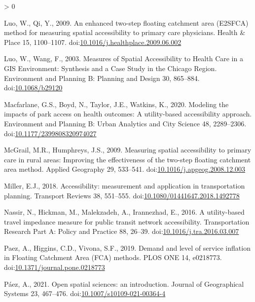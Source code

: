 \documentclass[]{elsarticle} %
\newlength{\cslhangindent}
\newenvironment{CSLReferences}[2] %
 {%
  \setlength{\parindent}{0pt}
  \ifodd #1 \everypar{\setlength{\hangindent}{\cslhangindent}}\ignorespaces\fi
  \ifnum #2 > 0
  \setlength{\parskip}{#2\baselineskip}
  \fi
 }%
 {}
\begin{document}
\begin{CSLReferences}{1}{0}
\leavevmode\hypertarget{ref-luo2009}{}%
Luo, W., Qi, Y., 2009. An enhanced two-step floating catchment area
(E2SFCA) method for measuring spatial accessibility to primary care
physicians. Health \& Place 15, 1100--1107.
doi:\href{https://doi.org/10.1016/j.healthplace.2009.06.002}{10.1016/j.healthplace.2009.06.002}

\leavevmode\hypertarget{ref-luo2003}{}%
Luo, W., Wang, F., 2003. Measures of Spatial Accessibility to Health
Care in a GIS Environment: Synthesis and a Case Study in the Chicago
Region. Environment and Planning B: Planning and Design 30, 865--884.
doi:\href{https://doi.org/10.1068/b29120}{10.1068/b29120}

\leavevmode\hypertarget{ref-macfarlane2020}{}%
Macfarlane, G.S., Boyd, N., Taylor, J.E., Watkins, K., 2020. Modeling
the impacts of park access on health outcomes: A utility-based
accessibility approach. Environment and Planning B: Urban Analytics and
City Science 48, 2289--2306.
doi:\href{https://doi.org/10.1177/2399808320974027}{10.1177/2399808320974027}

\leavevmode\hypertarget{ref-mcgrail2009}{}%
McGrail, M.R., Humphreys, J.S., 2009. Measuring spatial accessibility to
primary care in rural areas: Improving the effectiveness of the two-step
floating catchment area method. Applied Geography 29, 533--541.
doi:\href{https://doi.org/10.1016/j.apgeog.2008.12.003}{10.1016/j.apgeog.2008.12.003}

\leavevmode\hypertarget{ref-miller2018}{}%
Miller, E.J., 2018. Accessibility: measurement and application in
transportation planning. Transport Reviews 38, 551--555.
doi:\href{https://doi.org/10.1080/01441647.2018.1492778}{10.1080/01441647.2018.1492778}

\leavevmode\hypertarget{ref-nassir2016}{}%
Nassir, N., Hickman, M., Malekzadeh, A., Irannezhad, E., 2016. A
utility-based travel impedance measure for public transit network
accessibility. Transportation Research Part A: Policy and Practice 88,
26--39.
doi:\href{https://doi.org/10.1016/j.tra.2016.03.007}{10.1016/j.tra.2016.03.007}

\leavevmode\hypertarget{ref-paez2019}{}%
Paez, A., Higgins, C.D., Vivona, S.F., 2019. Demand and level of service
inflation in Floating Catchment Area (FCA) methods. PLOS ONE 14,
e0218773.
doi:\href{https://doi.org/10.1371/journal.pone.0218773}{10.1371/journal.pone.0218773}

\leavevmode\hypertarget{ref-paez2021}{}%
Páez, A., 2021. Open spatial sciences: an introduction. Journal of
Geographical Systems 23, 467--476.
doi:\href{https://doi.org/10.1007/s10109-021-00364-4}{10.1007/s10109-021-00364-4}


\end{CSLReferences}
\end{document}
